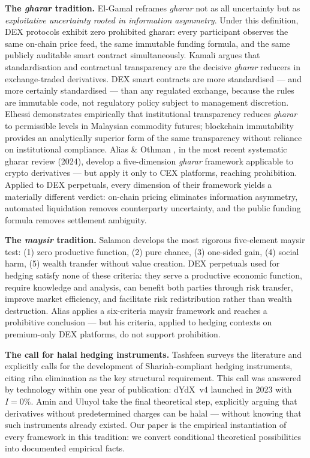 \documentclass[10pt,twocolumn]{article}
\begin{document}
\textbf{The \textit{gharar} tradition.}
El-Gamal \cite{ElGamal2001} reframes \textit{gharar} not as all uncertainty but as
\emph{exploitative uncertainty rooted in information asymmetry}.
Under this definition, DEX protocols exhibit zero prohibited gharar: every
participant observes the same on-chain price feed, the same immutable funding
formula, and the same publicly auditable smart contract simultaneously.
Kamali \cite{Kamali2000} argues that standardisation and contractual transparency
are the decisive \textit{gharar} reducers in exchange-traded derivatives.
DEX smart contracts are more standardised --- and more certainly standardised ---
than any regulated exchange, because the rules are immutable code, not regulatory
policy subject to management discretion.
Elhessi \cite{Elhessi2018} demonstrates empirically that institutional transparency
reduces \textit{gharar} to permissible levels in Malaysian commodity futures;
blockchain immutability provides an analytically superior form of the same
transparency without reliance on institutional compliance.
Alias \& Othman \cite{AliasOthman2024}, in the most recent systematic gharar
review (2024), develop a five-dimension \textit{gharar} framework applicable to
crypto derivatives --- but apply it only to CEX platforms, reaching prohibition.
Applied to DEX perpetuals, every dimension of their framework yields a materially
different verdict: on-chain pricing eliminates information asymmetry,
automated liquidation removes counterparty uncertainty, and the public funding
formula removes settlement ambiguity.

\textbf{The \textit{maysir} tradition.}
Salamon \cite{Salamon2015} develops the most rigorous five-element maysir test:
(1) zero productive function, (2) pure chance, (3) one-sided gain, (4)
social harm, (5) wealth transfer without value creation.
DEX perpetuals used for hedging satisfy none of these criteria: they serve a
productive economic function, require knowledge and analysis, can benefit both
parties through risk transfer, improve market efficiency, and facilitate risk
redistribution rather than wealth destruction.
Alias \cite{Alias2021} applies a six-criteria maysir framework and reaches a
prohibitive conclusion --- but his criteria, applied to hedging contexts on
premium-only DEX platforms, do not support prohibition.

\textbf{The call for halal hedging instruments.}
Tashfeen \cite{Tashfeen2022} surveys the literature and explicitly calls for the
development of Shariah-compliant hedging instruments, citing riba elimination as
the key structural requirement.
This call was answered by technology within one year of publication: dYdX~v4
launched in 2023 with $I = 0\%$.
Amin \cite{Amin2024} and Uluyol \cite{Uluyol2024} take the final theoretical
step, explicitly arguing that derivatives without predetermined charges can be
halal --- without knowing that such instruments already existed.
Our paper is the empirical instantiation of every framework in this tradition:
we convert conditional theoretical possibilities into documented empirical facts.
\end{document}
